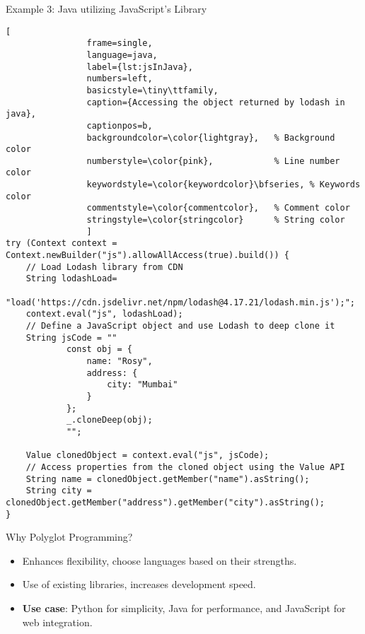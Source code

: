 \begin{frame}[fragile]{Example 3: Java utilizing JavaScript's Library}
    \begin{center}
        \begin{minipage}{0.8\textwidth} %
            \begin{lstlisting}[
                frame=single,
                language=java,
                label={lst:jsInJava},
                numbers=left,
                basicstyle=\tiny\ttfamily,
                caption={Accessing the object returned by lodash in java},
                captionpos=b,
                backgroundcolor=\color{lightgray},   % Background color
                numberstyle=\color{pink},            % Line number color
                keywordstyle=\color{keywordcolor}\bfseries, % Keywords color
                commentstyle=\color{commentcolor},   % Comment color
                stringstyle=\color{stringcolor}      % String color
                ]
try (Context context = Context.newBuilder("js").allowAllAccess(true).build()) {
    // Load Lodash library from CDN
    String lodashLoad=
            "load('https://cdn.jsdelivr.net/npm/lodash@4.17.21/lodash.min.js');";
    context.eval("js", lodashLoad);
    // Define a JavaScript object and use Lodash to deep clone it
    String jsCode = ""
            const obj = {
                name: "Rosy",
                address: {
                    city: "Mumbai"
                }
            };
            _.cloneDeep(obj);
            "";

    Value clonedObject = context.eval("js", jsCode);
    // Access properties from the cloned object using the Value API
    String name = clonedObject.getMember("name").asString();
    String city = clonedObject.getMember("address").getMember("city").asString();
}
            \end{lstlisting}
        \end{minipage}
    \end{center}
\end{frame}

\begin{frame}{Why Polyglot Programming?}
    \begin{itemize}
        \item Enhances flexibility, choose languages based on their strengths.
        \vspace{3mm}
        \item Use of existing libraries, increases development speed.
        \vspace{3mm}
        \item \textbf{Use case}: Python for simplicity, Java for performance, and JavaScript for web integration.
    \end{itemize}
\end{frame}

